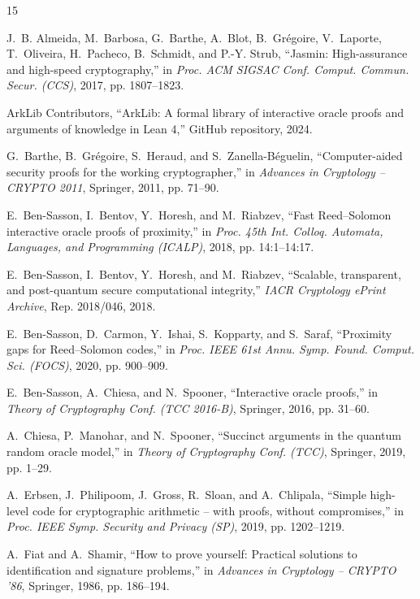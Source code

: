 \documentclass[conference]{IEEEtran}
\theoremstyle{definition}
\begin{document}
\begin{thebibliography}{15}

J.~B. Almeida, M.~Barbosa, G.~Barthe, A.~Blot, B.~Gr{\'e}goire, V.~Laporte, T.~Oliveira, H.~Pacheco, B.~Schmidt, and P.-Y. Strub, ``Jasmin: High-assurance and high-speed cryptography,'' in \emph{Proc. ACM SIGSAC Conf. Comput. Commun. Secur. (CCS)}, 2017, pp. 1807--1823.

ArkLib Contributors, ``ArkLib: A formal library of interactive oracle proofs and arguments of knowledge in {Lean 4},'' GitHub repository, 2024.

G.~Barthe, B.~Gr{\'e}goire, S.~Heraud, and S.~Zanella-B{\'e}guelin, ``Computer-aided security proofs for the working cryptographer,'' in \emph{Advances in Cryptology -- CRYPTO 2011}, Springer, 2011, pp. 71--90.

E.~Ben-Sasson, I.~Bentov, Y.~Horesh, and M.~Riabzev, ``Fast {Reed--Solomon} interactive oracle proofs of proximity,'' in \emph{Proc. 45th Int. Colloq. Automata, Languages, and Programming (ICALP)}, 2018, pp. 14:1--14:17.

E.~Ben-Sasson, I.~Bentov, Y.~Horesh, and M.~Riabzev, ``Scalable, transparent, and post-quantum secure computational integrity,'' \emph{IACR Cryptology ePrint Archive}, Rep. 2018/046, 2018.

E.~Ben-Sasson, D.~Carmon, Y.~Ishai, S.~Kopparty, and S.~Saraf, ``Proximity gaps for {Reed--Solomon} codes,'' in \emph{Proc. IEEE 61st Annu. Symp. Found. Comput. Sci. (FOCS)}, 2020, pp. 900--909.

E.~Ben-Sasson, A.~Chiesa, and N.~Spooner, ``Interactive oracle proofs,'' in \emph{Theory of Cryptography Conf. (TCC 2016-B)}, Springer, 2016, pp. 31--60.

A.~Chiesa, P.~Manohar, and N.~Spooner, ``Succinct arguments in the quantum random oracle model,'' in \emph{Theory of Cryptography Conf. (TCC)}, Springer, 2019, pp. 1--29.

A.~Erbsen, J.~Philipoom, J.~Gross, R.~Sloan, and A.~Chlipala, ``Simple high-level code for cryptographic arithmetic -- with proofs, without compromises,'' in \emph{Proc. IEEE Symp. Security and Privacy (SP)}, 2019, pp. 1202--1219.

A.~Fiat and A.~Shamir, ``How to prove yourself: Practical solutions to identification and signature problems,'' in \emph{Advances in Cryptology -- CRYPTO '86}, Springer, 1986, pp. 186--194.


\end{thebibliography}
\end{document}
